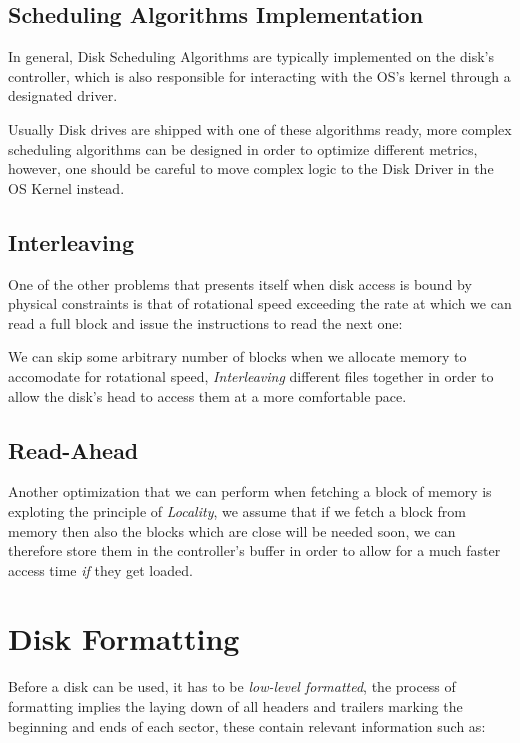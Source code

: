 \documentclass[openright, twoside]{report}
\theoremstyle{definition}
\theoremstyle{example}
\begin{document}
\subsection{Scheduling Algorithms Implementation}
In general, Disk Scheduling Algorithms are typically implemented on the disk's controller,
which is also responsible for interacting with the OS's kernel through a designated driver.

Usually Disk drives are shipped with one of these algorithms ready, more complex scheduling 
algorithms can be designed in order to optimize different metrics, however, one should be careful 
to move complex logic to the Disk Driver in the OS Kernel instead.

\subsection{Interleaving} 
One of the other problems that presents itself when disk access is bound by physical constraints is  
that of rotational speed exceeding the rate at which we can read a full block and issue the instructions to 
read the next one:\\


We can skip some arbitrary number of blocks when we allocate memory to accomodate for rotational speed, 
\emph{Interleaving} different files together in order to allow the disk's head to access them at a 
more comfortable pace.

\subsection{Read-Ahead}
Another optimization that we can perform when fetching a block of memory is exploting the principle 
of \emph{Locality}, we assume that if we fetch a block from memory then also the blocks which are close 
will be needed soon, we can therefore store them in the controller's buffer in order to allow for a much 
faster access time \emph{if} they get loaded.

\section{Disk Formatting}
Before a disk can be used, it has to be \emph{low-level formatted}, the process of formatting 
implies the laying down of all headers and trailers marking the beginning and ends of 
each sector, these contain relevant information such as:
\end{document}
